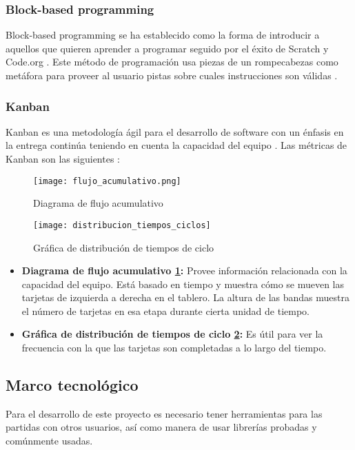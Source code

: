 \subsubsection{Block-based programming}
Block-based programming se ha establecido como la forma de introducir a aquellos que quieren aprender a 
programar seguido por el éxito de Scratch y Code.org \cite{block_based_programming}. 
Este método de programación usa piezas de un rompecabezas como metáfora para proveer al usuario pistas sobre cuales instrucciones son válidas \cite{block_based_programming}. 

\subsubsection{Kanban}
Kanban es una metodología ágil para el desarrollo de software con un énfasis 
en la entrega continúa teniendo en cuenta la capacidad del equipo \cite{romano-a}. 
Las métricas de Kanban son las siguientes \cite{najera2018a}:

\begin{figure}[h]
    \caption{Diagrama de flujo acumulativo}
    \centering
    \texttt{[image: flujo\_acumulativo.png]}
    \label{fig:flujo_acumulativo}
\end{figure}

\begin{figure}[h]
    \caption{Gráfica de distribución de tiempos de ciclo}
    \centering
    \texttt{[image: distribucion\_tiempos\_ciclos]}
    \label{fig:distribucion_tiempos_ciclos}
\end{figure}

\begin{itemize}
    \item \textbf{Diagrama de flujo acumulativo \ref{fig:flujo_acumulativo}:} Provee información relacionada con la capacidad del equipo. Está basado en tiempo y muestra cómo se mueven las tarjetas de izquierda a derecha en el tablero. La altura de las bandas muestra el número de tarjetas en esa etapa durante cierta unidad de tiempo.
    \item \textbf{Gráfica de distribución de tiempos de ciclo \ref{fig:distribucion_tiempos_ciclos}:} Es útil para ver la frecuencia con la que las tarjetas son completadas a lo largo del tiempo.
\end{itemize}

\subsection{Marco tecnológico}
Para el desarrollo de este proyecto es necesario tener herramientas para las partidas con otros usuarios, así como manera de usar librerías probadas y comúnmente usadas.

